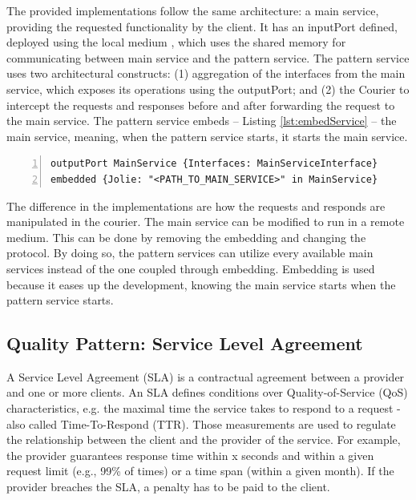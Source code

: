 \documentclass[12pt]{article}
\begin{document}
The provided implementations follow the same architecture: a main service, providing the requested functionality by the client. It has an inputPort defined, deployed using the local medium \cite{LocalLoc}, which uses the shared memory for communicating between main service and the pattern service. The pattern service uses two architectural constructs: (1) aggregation of the interfaces from the main service, which exposes its operations using the outputPort; and (2) the Courier \cite{Courier} to intercept the requests and responses before and after forwarding the request to the main service. The pattern service embeds -- Listing \ref{lst:embedService} -- the main service, meaning, when the pattern service starts, it starts the main service. 
\\
\begin{lstlisting}[caption=Embed main service into the pattern service, 
    captionpos=b, label={lst:embedService}, frame=single, breaklines=true, numbers=left, basicstyle=\scriptsize]
outputPort MainService {Interfaces: MainServiceInterface}
embedded {Jolie: "<PATH_TO_MAIN_SERVICE>" in MainService}
\end{lstlisting}

The difference in the implementations are how the requests and responds are manipulated in the courier. The main service can be modified to run in a remote medium. This can be done by removing the embedding and changing the protocol. By doing so, the pattern services can utilize every available main services instead of the one coupled through embedding. Embedding is used because it eases up the development, knowing the main service starts when the pattern service starts.

\subsection{Quality Pattern: Service Level Agreement}
A Service Level Agreement (SLA) \cite{SLA} is a contractual agreement between a provider and one or more clients. An SLA defines conditions over Quality-of-Service (QoS) \cite{QoS} characteristics, e.g. the maximal time the service takes to respond to a request - also called Time-To-Respond (TTR). Those measurements are used to regulate the relationship between the client and the provider of the service. For example, the provider guarantees response time within x seconds and within a given request limit (e.g., 99\% of times) or a time span (within a given month). If the provider breaches the SLA, a penalty has to be paid to the client.
\end{document}
